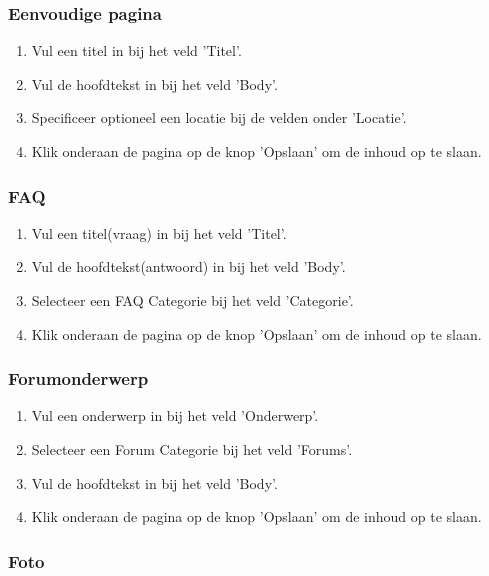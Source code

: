 \subsubsection{Eenvoudige pagina}\label{eenvoudigepagina}

\begin{enumerate}
\item Vul een titel in bij het veld 'Titel'.
\item Vul de hoofdtekst in bij het veld 'Body'.
\item Specificeer optioneel een locatie bij de velden onder 'Locatie'.
\item Klik onderaan de pagina op de knop 'Opslaan' om de inhoud op te slaan.
\end{enumerate}

\subsubsection{FAQ}\label{faq}

\begin{enumerate}
\item Vul een titel(vraag) in bij het veld 'Titel'.
\item Vul de hoofdtekst(antwoord) in bij het veld 'Body'.
\item Selecteer een FAQ Categorie bij het veld 'Categorie'.
\item Klik onderaan de pagina op de knop 'Opslaan' om de inhoud op te slaan.
\end{enumerate}

\subsubsection{Forumonderwerp}\label{forumonderwerp}

\begin{enumerate}
\item Vul een onderwerp in bij het veld 'Onderwerp'.
\item Selecteer een Forum Categorie bij het veld 'Forums'.
\item Vul de hoofdtekst in bij het veld 'Body'.
\item Klik onderaan de pagina op de knop 'Opslaan' om de inhoud op te slaan.
\end{enumerate}

\subsubsection{Foto}\label{foto}

